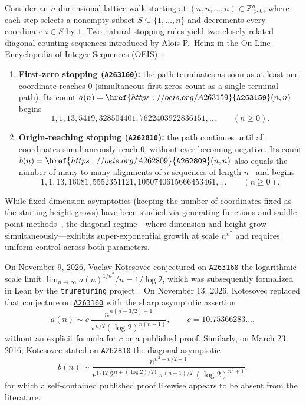 \documentclass[11pt,a4paper]{article}
\theoremstyle{remark}
\newcommand{\oeis}[1]{\href{https://oeis.org/#1}{\texttt{#1}}}
\begin{document}
Consider an $n$-dimensional lattice walk starting at $(n,n,\dots,n)\in\mathbb{Z}_{>0}^n$, where each step selects a nonempty subset $S\subseteq\{1,\dots,n\}$ and decrements every coordinate $i\in S$ by $1$. Two natural stopping rules yield two closely related diagonal counting sequences introduced by Alois P.~Heinz in the On-Line Encyclopedia of Integer Sequences (OEIS)~\cite{OEIS}:
\begin{enumerate}
  \item \textbf{First-zero stopping (\oeis{A263160}):} the path terminates as soon as at least one coordinate reaches $0$ (simultaneous first zeros count as a single terminal path). Its count $a(n)=\oeis{A263159}(n,n)$ begins
  \[
    1, 1, 13, 5419, 328504401, 7622403922836151, \dots \qquad (n\ge 0).
  \]
  \item \textbf{Origin-reaching stopping (\oeis{A262810}):} the path continues until all coordinates simultaneously reach $0$, without ever becoming negative. Its count $b(n)=\oeis{A262809}(n,n)$ also equals the number of many-to-many alignments of $n$ sequences of length $n$~\cite{Slowinski1998,Eger2015} and begins
  \[
    1, 1, 13, 16081, 5552351121, 1050740615666453461, \dots \qquad (n\ge 0).
  \]
\end{enumerate}

While fixed-dimension asymptotics (keeping the number of coordinates fixed as the starting height grows) have been studied via generating functions and saddle-point methods~\cite{Eger2015}, the diagonal regime---where dimension and height grow simultaneously---exhibits super-exponential growth at scale $n^{n^2}$ and requires uniform control across both parameters.

On November 9, 2026, Vaclav Kotesovec conjectured on \oeis{A263160} the logarithmic-scale limit $\lim_{n\to\infty} a(n)^{1/n^2}/n = 1/\log 2$, which was subsequently formalized in Lean by the \texttt{trureturing} project~\cite{Trureturing2026}. On November 13, 2026, Kotesovec replaced that conjecture on \oeis{A263160} with the sharp asymptotic assertion
\begin{equation}\label{eq:a263160-kotesovec}
  a(n) \sim c\,\frac{n^{n(n-3/2)+1}}{\pi^{n/2}(\log 2)^{n(n-1)}},
  \qquad c = 10.75366283\ldots,
\end{equation}
without an explicit formula for $c$ or a published proof. Similarly, on March 23, 2016, Kotesovec stated on \oeis{A262810} the diagonal asymptotic
\begin{equation}\label{eq:a262810-kotesovec}
  b(n) \sim \frac{n^{n^2 - n/2 + 1}}{e^{1/12}\,2^{n + (\log 2)/24}\,\pi^{(n-1)/2}\,(\log 2)^{n^2+1}},
\end{equation}
for which a self-contained published proof likewise appears to be absent from the literature.
\end{document}
